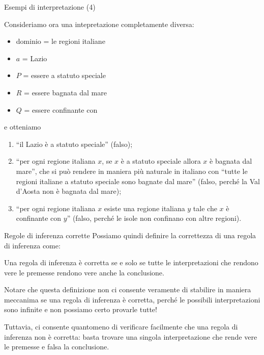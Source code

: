 \documentclass[10pt,dvipsnames,xcolor=table,handout]{beamer}
\begin{document}
\begin{frame}{Esempi di interpretazione (4)}
    \begin{example}
        Consideriamo ora una intepretazione completamente diversa:
        \begin{itemize}
            \item dominio = le regioni italiane
            \item $a$ = Lazio
            \item $P$ = essere a statuto speciale
            \item $R$ = essere bagnata dal mare
            \item $Q$ = essere confinante con
        \end{itemize}
        e otteniamo
        \begin{enumerate}
            \item ``il Lazio è a statuto speciale'' (falso);
            \item ``per ogni regione italiana $x$, se $x$ è a statuto speciale allora $x$ è bagnata dal mare'', che si può rendere in maniera più naturale in italiano con ``tutte le regioni italiane a statuto speciale sono bagnate dal mare'' (falso, perché la Val d'Aosta non è bagnata dal mare);
            \item ``per ogni regione italiana $x$ esiste una regione italiana $y$ tale che $x$ è confinante con $y$'' (falso, perché le isole non confinano con altre regioni).
        \end{enumerate}
    \end{example}
\end{frame}

\begin{frame}{Regole di inferenza corrette}
    Possiamo quindi definire la correttezza di una regola di inferenza come:
    \begin{definition}
        Una regola di inferenza è corretta se e solo se  tutte le interpretazioni che rendono vere le premesse rendono vere anche la conclusione.
    \end{definition}

    \medskip
    Notare che questa definizione non ci consente veramente di stabilire in maniera meccanima se una regola di inferenza è corretta, perché le possibili interpretazioni sono infinite e non possiamo certo provarle tutte!

    \medskip
    Tuttavia, ci consente quantomeno di verificare facilmente che una regola di inferenza non è corretta: basta trovare una singola interpretazione che rende vere le premesse e falsa la conclusione.
\end{frame}
\end{document}
